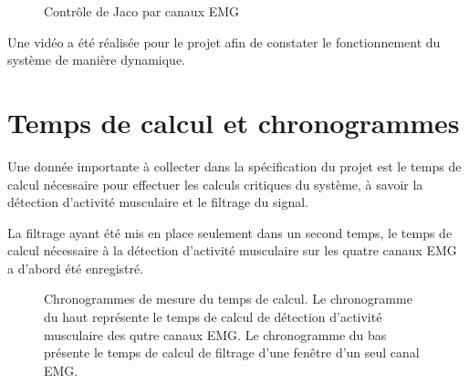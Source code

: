 \documentclass[letterpaper, twoside, 12pt, memoire, creativecommons, hyperref]{thETS}
\begin{document}
\begin{figure}
	\centering
	\caption{Contrôle de Jaco par canaux EMG}
	\label{fig:montageglobal}
\end{figure}

Une vidéo a été réalisée pour le projet afin de constater le fonctionnement du système de manière dynamique.

\section{Temps de calcul et chronogrammes}

Une donnée importante à collecter dans la spécification du projet est le temps de calcul nécessaire pour effectuer les calculs critiques du système, à savoir la détection d'activité musculaire et le filtrage du signal.

La filtrage ayant été mis en place seulement dans un second temps, le temps de calcul nécessaire à la détection d'activité musculaire sur les quatre canaux EMG a d'abord été enregistré. 

\begin{figure}
	\centering
	\caption{Chronogrammes de mesure du temps de calcul. Le chronogramme du haut représente le temps de calcul de détection d'activité musculaire des qutre canaux EMG. Le chronogramme du bas présente le temps de calcul de filtrage d'une fenêtre d'un seul canal EMG.}
	\label{fig:chronogrammes}
\end{figure}
\end{document}
